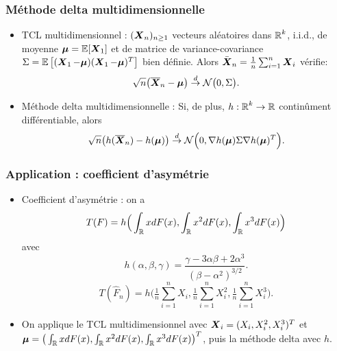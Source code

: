 \begin{frame}
\frametitle{Méthode \og delta\fg{} multidimensionnelle}
\begin{itemize}
\item \alert{TCL multidimensionnel :}
$(\operatorname{\boldsymbol{X}}_n)_{n\ge 1}$ vecteurs aléatoires dans $\operatorname{{\mathbb R}}^k$, i.i.d., de
moyenne ${\boldsymbol \mu} = \operatorname{{\mathbb E}}[\operatorname{\boldsymbol{X}}_1]$ et de matrice de
variance-covariance $\Sigma =
\operatorname{{\mathbb E}}\big[(\operatorname{\boldsymbol{X}}_1-\boldsymbol{\mu})(\operatorname{\boldsymbol{X}}_1-\boldsymbol{\mu})^T\big]$ bien
définie. Alors $\bar {\operatorname{\boldsymbol{X}}}_n=\tfrac{1}{n}\sum_{i = 1}^n\operatorname{\boldsymbol{X}}_i$
v\'erifie:
$$\sqrt{n}\big(\overline{\operatorname{\boldsymbol{X}}}_n-\boldsymbol{\mu}\big) \stackrel{d}{\rightarrow} {\mathcal N}\big(0,\Sigma\big).$$
\item \alert{Méthode \og delta\fg{} multidimensionnelle :} Si, de plus, $h : \operatorname{{\mathbb R}}^k \rightarrow \operatorname{{\mathbb R}}$ continûment différentiable, alors
$$\sqrt{n}\big(h(\overline{\operatorname{\boldsymbol{X}}}_n)-h(\boldsymbol{\mu})\big) \stackrel{d}{\rightarrow} {\mathcal N}\Big(0, \nabla h(\boldsymbol{\mu}) \Sigma \nabla h(\boldsymbol{\mu})^T\Big).$$
\end{itemize}
\end{frame}
\begin{frame}
\frametitle{Application : coefficient d'asymétrie}
\begin{itemize}
\item \alert{Coefficient d'asymétrie :} on a
$$T(F) = h\Big(\int_{\operatorname{{\mathbb R}}} xdF(x),\int_{\operatorname{{\mathbb R}}} x^2 dF(x), \int_{\operatorname{{\mathbb R}}} x^3 dF(x)\Big)$$ avec
$$h(\alpha,\beta,\gamma) = \frac{\gamma-3\alpha \beta+2\alpha^3}{(\beta-\alpha^2)^{3/2}}.$$
$$T(\widehat F_n) = h\Big(\tfrac{1}{n}\sum_{i = 1}^n X_i, \tfrac{1}{n}\sum_{i = 1}^n X_i^2,\tfrac{1}{n}\sum_{i = 1}^n X_i^3\Big).$$
\item On applique le TCL multidimensionnel avec $\operatorname{\boldsymbol{X}}_i = (X_i,X_i^2,X_i^3)^T$ et $\boldsymbol{\mu} = \big(\int_{\operatorname{{\mathbb R}}} xdF(x),\int_{\operatorname{{\mathbb R}}} x^2 dF(x),\int_{\operatorname{{\mathbb R}}} x^3 dF(x)\big)^T$, puis la méthode \og delta\fg{} avec $h$.
\end{itemize}
\end{frame}
